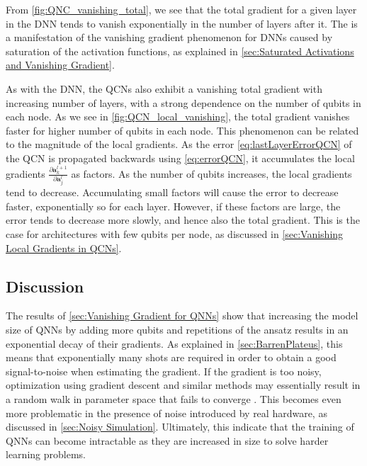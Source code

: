 From \cref{fig:QNC_vanishing_total}, we see that the total gradient for a given layer in the DNN tends to vanish exponentially in the number of layers after it. The is a manifestation of the vanishing gradient phenomenon for DNNs caused by saturation of the activation functions, as explained in \cref{sec:Saturated Activations and Vanishing Gradient}.

As with the DNN, the QCNs also exhibit a vanishing total gradient with increasing number of layers, with a strong dependence on the number of qubits in each node. As we see in \cref{fig:QCN_local_vanishing}, the total gradient vanishes faster for higher number of qubits in each node. This phenomenon can be related to the magnitude of the local gradients. As the error \cref{eq:lastLayerErrorQCN} of the QCN is propagated backwards using \cref{eq:errorQCN}, it accumulates the local gradients $\frac{\partial \boldsymbol{a}^{l+1}_k}{\partial \boldsymbol{a}^{l}_j}$ as factors. As the number of qubits increases, the local gradients tend to decrease. Accumulating small factors will cause the error to decrease faster, exponentially so for each layer. However, if these factors are large, the error tends to decrease more slowly, and hence also the total gradient. This is the case for architectures with few qubits per node, as discussed in \cref{sec:Vanishing Local Gradients in QCNs}.

\subsection{Discussion}\label{sec:Vanishing Gradient Phenomenon Discussion}
The results of \cref{sec:Vanishing Gradient for QNNs} show that increasing the model size of QNNs by adding more qubits and repetitions of the ansatz results in an exponential decay of their gradients. As explained in \cref{sec:BarrenPlateus}, this means that exponentially many shots are required in order to obtain a good signal-to-noise when estimating the gradient. If the gradient is too noisy, optimization using gradient descent and similar methods may essentially result in a random walk in parameter space that fails to converge \cite{skolik2020layerwise}. This becomes even more problematic in the presence of noise introduced by real hardware, as discussed in \cref{sec:Noisy Simulation}. Ultimately, this indicate that the training of QNNs can become intractable as they are increased in size to solve harder learning problems.    

